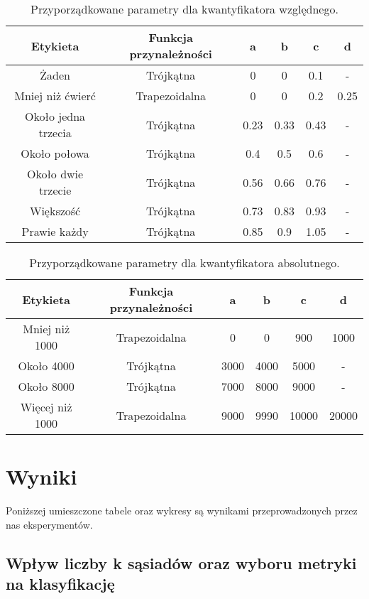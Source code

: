 \documentclass{classrep}
\begin{document}
\begin{table}[H]
	\centering
	\begin{tabular}{c c c c c c} 
		\hline
		\textbf{Etykieta} & \textbf{Funkcja przynależności} & \textbf{a} & \textbf{b} & \textbf{c} &  \textbf{d} \\ [0.5ex] 
		\hline
		\hline 
		Żaden & Trójkątna & 0 & 0 & 0.1 & - \\ 
		Mniej niż ćwierć & Trapezoidalna & 0 & 0 & 0.2 & 0.25 \\
		Około jedna trzecia & Trójkątna & 0.23 & 0.33 & 0.43 & - \\
		Około połowa & Trójkątna & 0.4 & 0.5 & 0.6 & - \\
		Około dwie trzecie & Trójkątna & 0.56 & 0.66 & 0.76 & - \\
		Większość & Trójkątna & 0.73 & 0.83 & 0.93 & - \\
		Prawie każdy & Trójkątna & 0.85 & 0.9 & 1.05 & - \\
		\hline
	\end{tabular}
	\caption{Przyporządkowane parametry dla kwantyfikatora względnego.}
\end{table}
\begin{table}[H]
	\centering
	\begin{tabular}{c c c c c c} 
		\hline
		\textbf{Etykieta} & \textbf{Funkcja przynależności} & \textbf{a} & \textbf{b} & \textbf{c} &  \textbf{d} \\ [0.5ex] 
		\hline
		\hline 
		Mniej niż 1000 & Trapezoidalna & 0 & 0 & 900 & 1000 \\ 
		Około 4000 & Trójkątna & 3000 & 4000 & 5000 & - \\
		Około 8000 & Trójkątna & 7000 & 8000 & 9000 & - \\
		Więcej niż 1000 & Trapezoidalna & 9000 & 9990 & 10000 & 20000 \\
		\hline
	\end{tabular}
	\caption{Przyporządkowane parametry dla kwantyfikatora absolutnego.}
\end{table}


\section{Wyniki}

Poniższej umieszczone tabele oraz wykresy są wynikami przeprowadzonych przez nas eksperymentów.

\subsection{Wpływ liczby k sąsiadów oraz wyboru metryki na klasyfikację}
\end{document}
